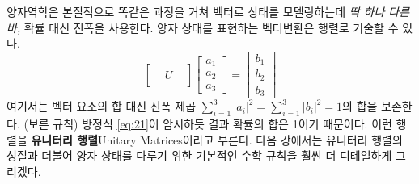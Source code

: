 \documentclass[a4paper,chapter,atbegshi,]{oblivoir}
\begin{document}
양자역학은 본질적으로 똑같은 과정을 거쳐 벡터로 상태를 모델링하는데 \emph{딱
하나 다른 바,} 확률 대신 진폭을 사용한다. 양자 상태를 표현하는 벡터변환은 
행렬로 기술할 수 있다.
\begin{equation}
  \begin{bmatrix} & & \\ & U & \\ & &\end{bmatrix}
  \begin{bmatrix}a_1\\a_2\\a_3\end{bmatrix}=
  \begin{bmatrix}b_1\\b_2\\b_3\end{bmatrix}
\end{equation}
여기서는 벡터 요소의 합 대신 진폭 제곱 $\sum_{i=1}^3 |a_i|^2 = \sum_{i=1}^3
|b_i|^2 = 1$의 합을 보존한다. (보른 규칙) 방정식 \ref{eq:21}이
암시하듯 결과 확률의 합은 1이기 때문이다. 이런 행렬을 \textbf{유니터리
행렬}{\footnotesize Unitary Matrices}이라고 부른다. 다음 강에서는 
유니터리 행렬의 성질과 더불어 양자 상태를 다루기 위한 기본적인
수학 규칙을 훨씬 더 디테일하게 그리겠다.
\end{document}
